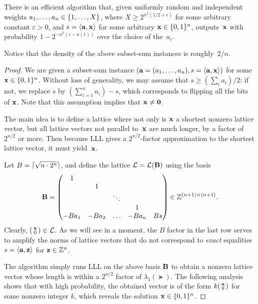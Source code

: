 \documentclass[11pt]{article}
\newcommand{\smlmat}[1]{\parens{
    \begin{smallmatrix}
      #1
    \end{smallmatrix}
  }
}
\begin{document}
\begin{theorem}
  There is an efficient algorithm that, given uniformly random and
  independent weights $a_{1},\ldots, a_{n} \in \{1,\ldots, X\}$,
  where $X \geq 2^{n^2(1/2+\epsilon)}$ for some arbitrary constant
  $\varepsilon > 0$, and $s = \langle\mathbf{a},\mathbf{x}\rangle$ for some arbitrary
  $\mathbf{x} \in \{0,1\}^{n}$, outputs~$\mathbf{x}$ with probability
  $1-2^{-n^{2} (\varepsilon - o(1))}$ over the choice of the~$a_{i}$.
\end{theorem}
Notice that the density of the above subset-sum instances is
roughly~$2/n$.

\begin{proof}
  We are given a subset-sum instance
  $(\mathbf{a} = (a_{1}, \ldots, a_{n}), s = \langle\mathbf{a}, \mathbf{x}\rangle)$ for
  some $\mathbf{x} \in \{0,1\}^{n}$. Without loss of generality, we may assume
  that $s \geq (\sum_{i} a_i)/2$: if not, we replace $s$ by
  $(\sum_{i=1}^{n} a_i) - s$, which corresponds to flipping all the
  bits of $\mathbf{x}$. Note that this assumption implies that
  $\mathbf{x} \neq \mathbf{0}$.
    
  The main idea is to define a lattice where not only is $\mathbf{x}$ a
  shortest nonzero lattice vector, but all lattice vectors not
  parallel to~$\mathbf{x}$ are much longer, by a factor of~$2^{n/2}$ or
  more. Then because LLL gives a $2^{n/2}$-factor approximation to the
  shortest lattice vector, it must yield~$\mathbf{x}$.

  Let $B = \lceil\sqrt{n\cdot 2^n}\rceil$, and define the lattice
  $\mathcal{L} = \mathcal{L}(\mathbf{B})$ using the basis
  \[ \mathbf{B} =
    \begin{pmatrix}
      1 & & & & \\
        & 1 & & & \\
        & & \ddots & & \\
        & & & 1 & \\
      -B a_1 & -B a_2 & \ldots & -B a_n & B s \\
    \end{pmatrix}
    \in \mathbb{Z}^{(n+1)\times (n+1)}. \] Clearly,
  $\smlmat{\vecx \\ 0} \in \lat$. As we will see in a moment, the $B$
  factor in the last row serves to amplify the norms of lattice
  vectors that do not correspond to \emph{exact} equalities
  $s = \langle\mathbf{a},\mathbf{z}\rangle$ for $\mathbf{z} \in \mathbb{Z}^{n}$.

  The algorithm simply runs LLL on the above basis $\mathbf{B}$ to obtain a
  nonzero lattice vector whose length is within a $2^{n/2}$ factor of
  $\lambda_{1}(\lat)$. The following analysis shows that with high
  probability, the obtained vector is of the form
  $k \smlmat{\vecx \\ 0}$ for some nonzero integer $k$, which reveals
  the solution $\mathbf{x} \in \{0,1\}^{n}$.
  

\end{proof}
\end{document}
